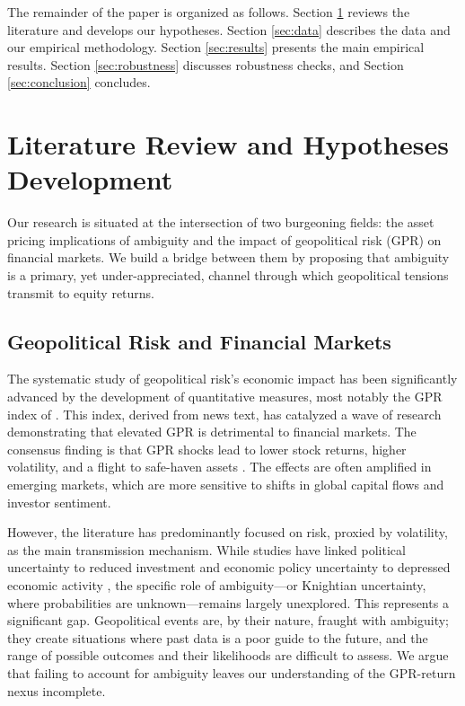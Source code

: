 \documentclass[preprint,12pt,authoryear]{elsarticle}
\begin{document}
The remainder of the paper is organized as follows. Section \ref{sec:literature} reviews the literature and develops our hypotheses. Section \ref{sec:data} describes the data and our empirical methodology. Section \ref{sec:results} presents the main empirical results. Section \ref{sec:robustness} discusses robustness checks, and Section \ref{sec:conclusion} concludes.

\section{Literature Review and Hypotheses Development}
\label{sec:literature}

Our research is situated at the intersection of two burgeoning fields: the asset pricing implications of ambiguity and the impact of geopolitical risk (GPR) on financial markets. We build a bridge between them by proposing that ambiguity is a primary, yet under-appreciated, channel through which geopolitical tensions transmit to equity returns.

\subsection{Geopolitical Risk and Financial Markets}

The systematic study of geopolitical risk's economic impact has been significantly advanced by the development of quantitative measures, most notably the GPR index of \citet{Caldara2022}. This index, derived from news text, has catalyzed a wave of research demonstrating that elevated GPR is detrimental to financial markets. The consensus finding is that GPR shocks lead to lower stock returns, higher volatility, and a flight to safe-haven assets \citep{Caldara2022}. The effects are often amplified in emerging markets, which are more sensitive to shifts in global capital flows and investor sentiment.

However, the literature has predominantly focused on risk, proxied by volatility, as the main transmission mechanism. While studies have linked political uncertainty to reduced investment \citep{Pastor2013} and economic policy uncertainty to depressed economic activity \citep{Baker2016}, the specific role of ambiguity—or Knightian uncertainty, where probabilities are unknown—remains largely unexplored. This represents a significant gap. Geopolitical events are, by their nature, fraught with ambiguity; they create situations where past data is a poor guide to the future, and the range of possible outcomes and their likelihoods are difficult to assess. We argue that failing to account for ambiguity leaves our understanding of the GPR-return nexus incomplete.
\end{document}
